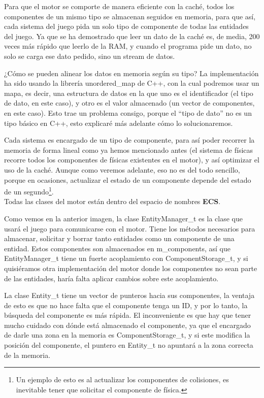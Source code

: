 Para que el motor se comporte de manera eficiente con la caché, todos los componentes de un mismo tipo se almacenan seguidos en memoria, para que así, cada sistema del juego pida un solo tipo de componente de todas las entidades del juego. Ya que se ha demostrado que leer un dato de la caché es, de media, 200 veces más rápido que leerlo de la RAM, y cuando el programa pide un dato, no solo se carga ese dato pedido, sino un stream de datos.

¿Cómo se pueden alinear los datos en memoria según su tipo? La implementación ha sido usando la librería unordered\_map de C++, con la cual podremos usar un mapa, es decir, una estructura de datos en la que uno es el identificador (el tipo de dato, en este caso), y otro es el valor almacenado (un vector de componentes, en este caso).  Esto trae un problema consigo, porque el ``tipo de dato'' no es un tipo básico en C++, esto explicaré más adelante cómo lo solucionaremos. 

Cada sistema es encargado de un tipo de componente, para así poder recorrer la memoria de forma lineal como ya hemos mencionado antes (el sistema de físicas recorre todos los componentes de físicas existentes en el motor), y así optimizar el uso de la caché. Aunque como veremos adelante, eso no es del todo sencillo, porque en ocasiones, actualizar el estado de un componente depende del estado de un segundo\footnote{Un ejemplo de esto es al actualizar los componentes de colisiones, es inevitable tener que solicitar el componente de física.}.
\\
Todas las clases del motor están dentro del espacio de nombres \textbf{ECS}.


Como vemos en la anterior imagen, la clase EntityManager\_t es la clase que usará el juego para comunicarse con el motor. Tiene los métodos necesarios para almacenar, solicitar y borrar tanto entidades como un componente de una entidad. Estos componentes son almacenados en m\_components, así que EntityManager\_t tiene un fuerte acoplamiento con ComponentStorage\_t, y si quisiéramos otra implementación del motor donde los componentes no sean parte de las entidades, haría falta aplicar cambios sobre este acoplamiento.

La clase Entity\_t tiene un vector de punteros hacia sus componentes, la ventaja de esto es que no hace falta que el componente tenga un ID, y por lo tanto, la búsqueda del componente es más rápida. El inconveniente es que hay que tener mucho cuidado con dónde está almacenado el componente, ya que el encargado de darle una zona en la memoria es ComponentStorage\_t, y si este modifica la posición del componente, el puntero en Entity\_t no apuntará a la zona correcta de la memoria. 

